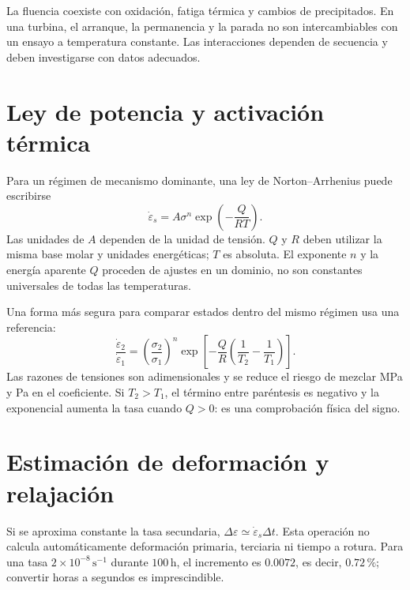 La fluencia coexiste con oxidación, fatiga térmica y cambios de precipitados. En una turbina, el arranque, la permanencia y la parada no son intercambiables con un ensayo a temperatura constante. Las interacciones dependen de secuencia y deben investigarse con datos adecuados.
\section{Ley de potencia y activación térmica}
Para un régimen de mecanismo dominante, una ley de Norton--Arrhenius puede escribirse
\begin{equation}\dot\varepsilon_s=A\sigma^n\exp\!\left(-\frac{Q}{RT}\right).\label{eq:norton}\end{equation}
Las unidades de $A$ dependen de la unidad de tensión. $Q$ y $R$ deben utilizar la misma base molar y unidades energéticas; $T$ es absoluta. El exponente $n$ y la energía aparente $Q$ proceden de ajustes en un dominio, no son constantes universales de todas las temperaturas.

Una forma más segura para comparar estados dentro del mismo régimen usa una referencia:
\begin{equation}\frac{\dot\varepsilon_2}{\dot\varepsilon_1}=\left(\frac{\sigma_2}{\sigma_1}\right)^n\exp\!\left[-\frac{Q}{R}\left(\frac1{T_2}-\frac1{T_1}\right)\right].\label{eq:nortonratio}\end{equation}
Las razones de tensiones son adimensionales y se reduce el riesgo de mezclar MPa y Pa en el coeficiente. Si $T_2>T_1$, el término entre paréntesis es negativo y la exponencial aumenta la tasa cuando $Q>0$: es una comprobación física del signo.
\section{Estimación de deformación y relajación}
Si se aproxima constante la tasa secundaria, $\Delta\varepsilon\simeq\dot\varepsilon_s\Delta t$. Esta operación no calcula automáticamente deformación primaria, terciaria ni tiempo a rotura. Para una tasa $2\times10^{-8}\,\mathrm{s^{-1}}$ durante $100\,\mathrm h$, el incremento es $0.0072$, es decir, $0.72\,\%$; convertir horas a segundos es imprescindible.

